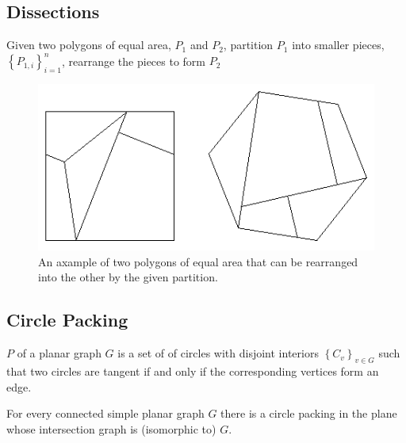 \subsection{Dissections}
\begin{prob}\label{def:dissection}
Given two polygons of equal area, $P_1$ and $P_2$, partition $P_1$ into smaller
pieces,$\left\lbrace P_{1,i}\right\rbrace_{i=1}^n $, rearrange the pieces to
form $P_2$
\end{prob}
\begin{figure}[h]
\begin{center}
\includegraphics[scale=1]{graphics/polygonaldissection.png}
\caption{An axample of two polygons of equal area that can be rearranged into
the other by the given partition.\cite{davidEppstienJunkyard}}
\label{fig:polygonaldissection}
\end{center}
\end{figure}
\subsection{Circle Packing}
\begin{definition}\label{def:circlePacking}
$P$ of a planar graph $G$ is a set of of circles with disjoint
interiors $\left\lbrace C_v \right\rbrace_{v \in G} $ such that two
circles are tangent if and only if the corresponding vertices form an edge.
\cite{arXiv13113363v1}
\end{definition} 


\begin{thm}\label{thm2-1}
For every connected simple planar graph $G$ there is a circle packing in the
plane whose intersection graph is (isomorphic to) $G$.
\cite{stephenson2005introduction}
\end{thm}
